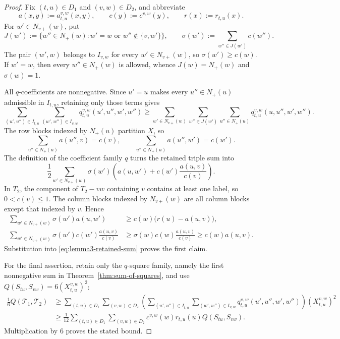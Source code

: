 \documentclass[pdflatex,sn-mathphys-num]{sn-jnl}
\theoremstyle{thmstyleone}
\begin{document}
\begin{proof}
Fix $(t,u)\in D_1$ and $(v,w)\in D_2$, and abbreviate
\[
a(x,y):=a_{t,u}^{v,w}(x,y),\qquad
c(y):=c^{v,w}(y),\qquad r(x):=r_{t,u}(x).
\]
For $w'\in N_{v+}(w)$, put
\[
J(w'):=\{w''\in N_+(w):w'=w\text{ or }w''\notin\{v,w'\}\},
\qquad
\sigma(w'):=\sum_{w''\in J(w')}c(w'').
\]
The pair $(w',w)$ belongs to $I_{v,w}$ for every
$w'\in N_{v+}(w)$, so $\sigma(w')\ge c(w)$.  If $w'=w$, then every
$w''\in N_+(w)$ is allowed, whence $J(w)=N_+(w)$ and $\sigma(w)=1$.

All $q$-coefficients are nonnegative.  Since $u'=u$ makes every
$u''\in N_+(u)$ admissible in $I_{t,u}$, retaining only those terms gives
\begingroup\footnotesize
\[
\sum_{(u',u'')\in I_{t,u}}
\sum_{(w',w'')\in I_{v,w}}q_{t,u}^{v,w}(u',u'',w',w'')
\ge
\sum_{w'\in N_{v+}(w)}\sum_{w''\in J(w')}
\sum_{u''\in N_+(u)}q_{t,u}^{v,w}(u,u'',w',w'').
\]
\endgroup
The row blocks indexed by $N_+(u)$ partition $X$, so
\[
\sum_{u''\in N_+(u)}a(u'',v)=c(v),
\qquad
\sum_{u''\in N_+(u)}a(u'',w')=c(w').
\]
The definition of the coefficient family $q$ turns the retained triple sum into
\begingroup\small
\begin{equation}
\frac12\sum_{w'\in N_{v+}(w)}\sigma(w')
\left(a(u,w')+c(w')\frac{a(u,v)}{c(v)}\right).
\label{eq:lemma3-retained-sum}
\end{equation}
\endgroup
In $T_2$, the component of $T_2-vw$ containing $v$ contains at least one
label, so $0<c(v)\le1$.  The column blocks indexed
by $N_{v+}(w)$ are all column blocks except that indexed by $v$.  Hence
\begin{align*}
\sum_{w'\in N_{v+}(w)}\sigma(w')a(u,w')
&\ge c(w)\bigl(r(u)-a(u,v)\bigr),\\
\sum_{w'\in N_{v+}(w)}\sigma(w')c(w')\frac{a(u,v)}{c(v)}
&\ge \sigma(w)c(w)\frac{a(u,v)}{c(v)}
\ge c(w)a(u,v).
\end{align*}
Substitution into \eqref{eq:lemma3-retained-sum} proves the first claim.

For the final assertion, retain only the $q$-square family, namely the first
nonnegative sum in Theorem~\ref{thm:sum-of-squares}, and use
$Q(S_{tu},S_{vw})=6(X_{t,u}^{v,w})^2$:
\begin{align*}
\frac16Q(\mathcal T_1,\mathcal T_2)
&\ge\sum_{(t,u)\in D_1}\sum_{(v,w)\in D_2}
\left(
\sum_{(u',u'')\in I_{t,u}}
\sum_{(w',w'')\in I_{v,w}}
q_{t,u}^{v,w}(u',u'',w',w'')
\right)
(X_{t,u}^{v,w})^2\\
&\ge\frac1{12}\sum_{(t,u)\in D_1}\sum_{(v,w)\in D_2}
c^{v,w}(w)r_{t,u}(u)Q(S_{tu},S_{vw}).
\end{align*}
Multiplication by $6$ proves the stated bound.
\end{proof}
\end{document}
